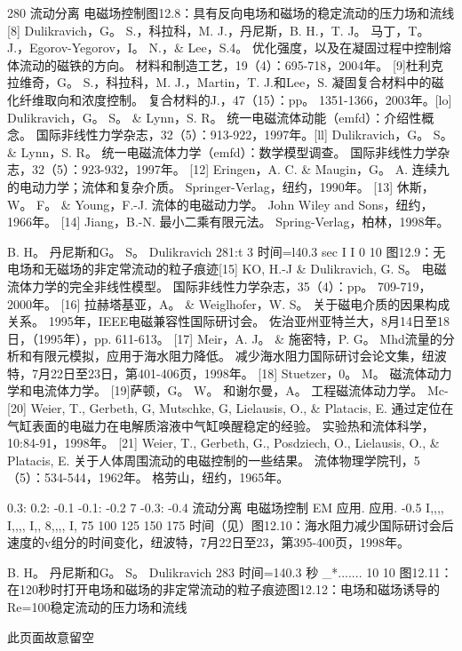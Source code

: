 \documentclass[UTF8,11pt,a4paper,openany,fontset=fandol]{ctexbook}
\begin{document}
280 流动分离 电磁场控制图12.8：具有反向电场和磁场的稳定流动的压力场和流线[8] Dulikravich，G。 S.，科拉科，M. J.，丹尼斯，B. H.，T. J。 马丁，T。 J.，Egorov-Yegorov，I。 N.，\& Lee，S.4。 优化强度，以及在凝固过程中控制熔体流动的磁铁的方向。 材料和制造工艺，19（4）：695-718，2004年。 [9]杜利克拉维奇，G。 S.，科拉科，M. J.，Martin，T. J.和Lee，S. 凝固复合材料中的磁化纤维取向和浓度控制。 复合材料的J.，47（15）：pp。 1351-1366，2003年。[lo] Dulikravich，G。 S。 \& Lynn，S. R。 统一电磁流体动能（emfd）：介绍性概念。 国际非线性力学杂志，32（5）：913-922，1997年。[ll] Dulikravich，G。 S。 \& Lynn，S. R。 统一电磁流体力学（emfd）：数学模型调查。 国际非线性力学杂志，32（5）：923-932，1997年。 [12] Eringen，A. C. \& Maugin，G。 A. 连续九的电动力学；流体和复杂介质。 Springer-Verlag，纽约，1990年。 [13] 休斯，W。 F。 \& Young，F.-J. 流体的电磁动力学。 John Wiley and Sons，纽约，1966年。 [14] Jiang，B.-N. 最小二乘有限元法。 Spring-Verlag，柏林，1998年。

B. H。 丹尼斯和G。 S。 Dulikravich 281:t 3 时间=l40.3 sec I I 0 10 图12.9：无电场和无磁场的非定常流动的粒子痕迹[15] KO, H.-J \& Dulikravich, G. S。 电磁流体力学的完全非线性模型。 国际非线性力学杂志，35（4）：pp。 709-719，2000年。 [16] 拉赫塔基亚，A。 \& Weiglhofer，W. S。 关于磁电介质的因果构成关系。 1995年，IEEE电磁兼容性国际研讨会。 佐治亚州亚特兰大，8月14日至18日，（1995年），pp. 611-613。 [17] Meir，A. J。 \& 施密特，P. G。 Mhd流量的分析和有限元模拟，应用于海水阻力降低。 减少海水阻力国际研讨会论文集，纽波特，7月22日至23日，第401-406页，1998年。 [18] Stuetzer，0。 M。 磁流体动力学和电流体力学。 [19]萨顿，G。 W。 和谢尔曼，A。 工程磁流体动力学。 Mc- [20] Weier, T., Gerbeth, G, Mutschke, G, Lielausis, O., \& Platacis, E. 通过定位在气缸表面的电磁力在电解质溶液中气缸唤醒稳定的经验。 实验热和流体科学，10:84-91，1998年。 [21] Weier, T., Gerbeth, G., Posdziech, O., Lielausis, O., \& Platacis, E. 关于人体周围流动的电磁控制的一些结果。 流体物理学院刊，5（5）：534-544，1962年。 格劳山，纽约，1965年。

0.3: 0.2: -0.1 -0.1: -0.2 7 -0.3: -0.4 流动分离 电磁场控制 EM 应用. 应用. -0.5 I,,,, I,,,, I,, 8,,,, I, 75 100 125 150 175 时间（见）图12.10：海水阻力减少国际研讨会后速度的v组分的时间变化，纽波特，7月22日至23，第395-400页，1998年。

B. H。 丹尼斯和G。 S。 Dulikravich 283 时间=140.3 秒 \_*....... 10 10 图12.11：在120秒时打开电场和磁场的非定常流动的粒子痕迹图12.12：电场和磁场诱导的Re=100稳定流动的压力场和流线

此页面故意留空

\clearpage
\end{document}
